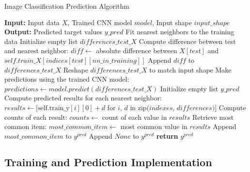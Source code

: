 \documentclass[a4paper, 12pt]{report}
\begin{document}
\begin{algorithm}
    \caption{Image Classification Prediction Algorithm}
    \label{alg:image_classification_final_prediction}
    \begin{algorithmic}[1]
            \State \textbf{Input:} Input data $X$, Trained CNN model $model$, Input shape $input\_shape$
            \State \textbf{Output:} Predicted target values $y\_pred$
            \State Fit nearest neighbors to the training data
            \State Initialize empty list $differences\_test\_X$
             
                    \State Compute difference between test and nearest neighbor: 
                    \State \quad $diff \gets$ absolute difference between $X[test]$ and $self.train\_X[indices[test][nn\_in\_training]]$
                    \State Append $diff$ to $differences\_test\_X$
                \EndFor
            \EndFor
            \State Reshape $differences\_test\_X$ to match input shape
            \State Make predictions using the trained CNN model: $predictions \gets model.predict(differences\_test\_X)$
            \State Initialize empty list $y\_pred$
                \State Compute predicted results for each nearest neighbor:
                \State \quad $results \gets [\text{self.train\_y}[i][0] + d$ for $i$, $d$ in zip($indexes$, $differences)$]
                \State Compute counts of each result: $counts \gets$ count of each value in $results$
                \State Retrieve most common item: $most\_common\_item \gets$ most common value in $results$
                    \State Append $most\_common\_item$ to $y^{pred}$
                \Else
                    \State Append $None$ to $y^{pred}$ 
                \EndIf
            \EndFor
            \State \textbf{return} $y^{pred}$
        \EndFunction
    \end{algorithmic}
\end{algorithm}
\clearpage

\subsection{Training and Prediction Implementation}
\end{document}
